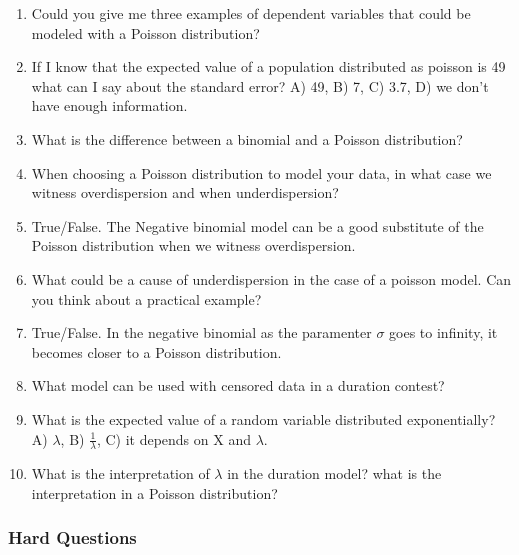 \documentclass[11pt]{article}
\begin{document}
\begin{enumerate}
\item Could you give me three examples of dependent variables that could be modeled with a Poisson distribution?
\item If I know that the expected value of a population distributed as poisson is 49 what can I say about the standard error? A) 49, B) 7, C) 3.7, D) we don't have enough information.
\item What is the difference between a binomial and a Poisson distribution?
\item When choosing a Poisson distribution to model your data, in what case we witness overdispersion and when underdispersion?
\item True/False. The Negative binomial model can be a good substitute of the Poisson distribution when we witness overdispersion.
\item What could be a cause of underdispersion in the case of a poisson model. Can you think about a practical example?
\item True/False. In the negative binomial as the paramenter $\sigma$ goes to infinity, it becomes closer to a Poisson distribution.
\item What model can be used with censored data in a duration contest?
\item What is the expected value of a random variable distributed exponentially? A) $\lambda$, B) $\frac{1}{\lambda}$, C) it depends on X and $\lambda$.
\item What is the interpretation of $\lambda$ in the duration model? what is the interpretation in a Poisson distribution?
\end{enumerate}

\subsubsection{Hard Questions}
\end{document}
